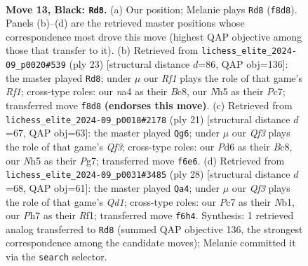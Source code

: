 \documentclass[11pt]{article}
\begin{document}
\clearpage

\begin{figure}[p]\centering
\begin{subfigure}{0.46\textwidth}\centering
\resizebox{\linewidth}{!}{%
\newchessgame
\chessboard[
  setfen={r1b2rk1/ppp2p1p/3p1qp1/4b2n/N1P1P3/3B3P/PP1Q1PP1/R1B2RK1 b - - 6 13},
  showmover=false,
  pgfstyle=straightmove, color=movearrow, markmove={f8-d8}
]}
\caption{}
\end{subfigure}\hfill
\begin{subfigure}{0.46\textwidth}\centering
\resizebox{\linewidth}{!}{%
\newchessgame
\chessboard[
  setfen={r1b2rk1/ppp2pp1/3p1q1p/2b5/4Q3/2PB4/PPP2PPP/R1B2RK1 b - - 1 12},
  showmover=false,
  pgfstyle=straightmove, color=movearrow, markmove={f8-d8}
]}
\caption{}
\end{subfigure}
\\[4pt]
\begin{subfigure}{0.46\textwidth}\centering
\resizebox{\linewidth}{!}{%
\newchessgame
\chessboard[
  setfen={r1b2rk1/pp3ppp/2pp1q2/4p3/2PbP3/8/PP1PBPPP/R1BQ1R1K b - - 1 11},
  showmover=false,
  pgfstyle=straightmove, color=movearrow, markmove={f6-g6}
]}
\caption{}
\end{subfigure}\hfill
\begin{subfigure}{0.46\textwidth}\centering
\resizebox{\linewidth}{!}{%
\newchessgame
\chessboard[
  setfen={r1b2rk1/p5b1/2p2qpp/n3pp2/8/2PP1B2/PP3PPP/RNBQ1RK1 w - - 1 15},
  showmover=false,
  pgfstyle=straightmove, color=movearrow, markmove={d1-a4}
]}
\caption{}
\end{subfigure}
\caption{\textbf{Move 13, Black: \texttt{Rd8}.} (a) Our position; Melanie plays \texttt{Rd8} (\texttt{f8d8}). Panels (b)--(d) are the retrieved master positions whose correspondence most drove this move (highest QAP objective among those that transfer to it). (b) Retrieved from \texttt{lichess\_elite\_2024-09\_p0020\#539} (ply 23) [structural distance $d$=86, QAP obj=136]: the master played \texttt{Rd8}; under $\mu$ our \emph{Rf1} plays the role of that game's \emph{Rf1}; cross-type roles: our \emph{n}a4 as their \emph{B}c8, our \emph{N}h5 as their \emph{P}c7; transferred move \texttt{f8d8} \textbf{(endorses this move)}. (c) Retrieved from \texttt{lichess\_elite\_2024-09\_p0018\#2178} (ply 21) [structural distance $d$=67, QAP obj=63]: the master played \texttt{Qg6}; under $\mu$ our \emph{Qf3} plays the role of that game's \emph{Qf3}; cross-type roles: our \emph{P}d6 as their \emph{B}c8, our \emph{N}h5 as their \emph{P}g7; transferred move \texttt{f6e6}. (d) Retrieved from \texttt{lichess\_elite\_2024-09\_p0031\#3485} (ply 28) [structural distance $d$=68, QAP obj=61]: the master played \texttt{Qa4}; under $\mu$ our \emph{Qf3} plays the role of that game's \emph{Qd1}; cross-type roles: our \emph{P}c7 as their \emph{N}b1, our \emph{P}h7 as their \emph{R}f1; transferred move \texttt{f6h4}. Synthesis: 1 retrieved analog transferred to \texttt{Rd8} (summed QAP objective 136, the strongest correspondence among the candidate moves); Melanie committed it via the \texttt{search} selector.}
\label{fig:thought-m25}
\end{figure}
\end{document}
